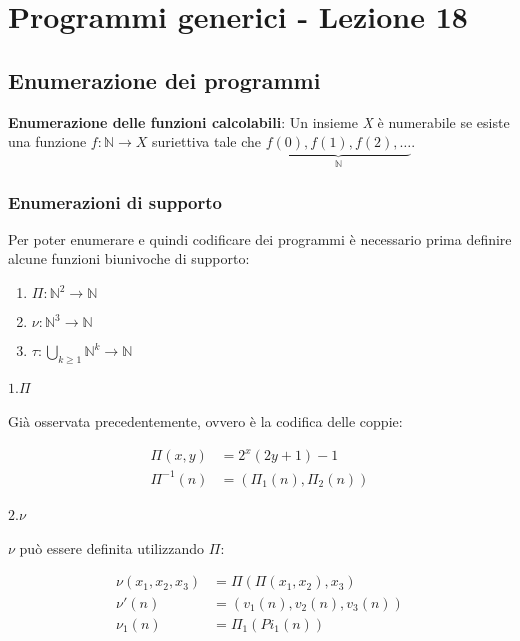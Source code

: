 \chapter{Programmi generici - Lezione 18}

\section{Enumerazione dei programmi}

\textbf{Enumerazione delle funzioni calcolabili}: Un insieme \textit{X} è numerabile se esiste una funzione $ f : \mathbb{N} \rightarrow X $ suriettiva tale che $ \underbrace{f(0), f(1), f(2), \ldots}_{\mathbb{N}} $.


\subsection{Enumerazioni di supporto}
Per poter enumerare e quindi codificare dei programmi è necessario prima definire alcune funzioni biunivoche di supporto:

\begin{enumerate}
	\item $ \Pi : \mathbb{N}^2 \rightarrow \mathbb{N}$
	\item $ \nu : \mathbb{N}^3 \rightarrow \mathbb{N}$
	\item $ \tau : \bigcup\limits_{k \geq 1}\mathbb{N}^k \rightarrow \mathbb{N}$
\end{enumerate}

\subsubsection{$1. \Pi $}

Già osservata precedentemente, ovvero è la codifica delle coppie:

\begin{align*}
\Pi(x, y) &= 2^x(2y + 1) - 1\\
\Pi^{-1}(n) &= (\Pi_1(n), \Pi_2(n))
\end{align*}

\subsubsection{$2. \nu $}

$\nu $ può essere definita utilizzando $ \Pi $:

\begin{align*}
\nu(x_1, x_2, x_3) &= \Pi(\Pi(x_1,x_2), x_3) \\
\nu'(n) &= (v_1(n), v_2(n), v_3(n)) \\
\nu_1(n) &= \Pi_1(Pi_1(n))
\end{align*}

